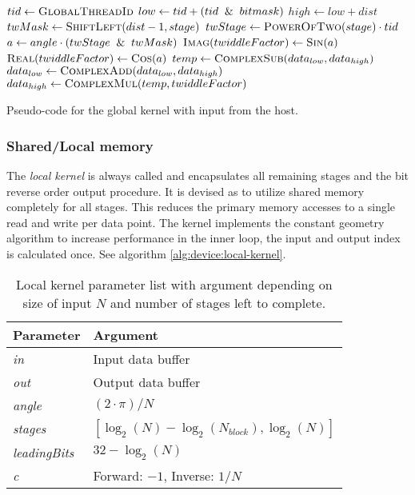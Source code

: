 \begin{algorithm}
	\centering
	\begin{algorithmic}[1]
            \State $tid \gets \Call{GlobalThreadId}{}$ 
            \State $low \gets tid + (tid \And bitmask)$
            \State $high \gets low + dist$
            \State $twMask \gets \Call{ShiftLeft}{dist - 1, stage}$
            \State $twStage \gets \Call{PowerOfTwo}{stage} \cdot tid$
            \State $a \gets angle \cdot (twStage \And twMask)$
            \State $\Call{Imag}{twiddleFactor} \gets \Call{Sin}{a}$
            \State $\Call{Real}{twiddleFactor} \gets \Call{Cos}{a}$
            \State $temp \gets \Call{ComplexSub}{data_{low}, data_{high}}$
            \State $data_{low} \gets \Call{ComplexAdd}{data_{low}, data_{high}}$
            \State $data_{high} \gets \Call{ComplexMul}{temp, twiddleFactor}$
        \EndProcedure
	\end{algorithmic}
	\caption{Pseudo-code for the global kernel with input from the host.}
	\label{alg:device:global-kernel}
\end{algorithm}

\subsubsection{Shared/Local memory}

The \textit{local kernel} is always called and encapsulates all remaining stages and the bit reverse order output procedure. It is devised as to utilize shared memory completely for all stages. This reduces the primary memory accesses to a single read and write per data point. The kernel implements the constant geometry algorithm to increase performance in the inner loop, the input and output index is calculated once. See algorithm \ref{alg:device:local-kernel}.

\begin{table}
	\centering
	\begin{tabular}{|l|l|}
		\hline
		Parameter & Argument \\ \hline
		\textit{in} & Input data buffer \\ \hline
		\textit{out} & Output data buffer \\ \hline
		\textit{angle} & $(2 \cdot \pi)/N$ \\ \hline
		\textit{stages} & $[\log_{2}(N) - \log_{2}(N_{block}), \log_{2}(N)]$ \\ \hline
		\textit{leadingBits} & $32 - \log_{2}(N)$ \\ \hline
		\textit{c} & Forward: $-1$, Inverse: $1/N$ \\ \hline
	\end{tabular}
	\caption{Local kernel parameter list with argument depending on size of input $N$ and number of stages left to complete.}
	\label{tab:local-kernel}
\end{table}

